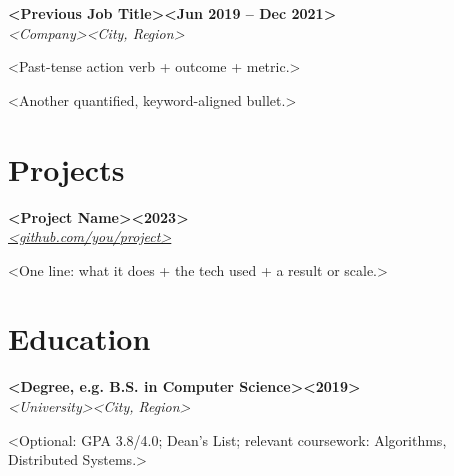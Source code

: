 \documentclass[letterpaper,11pt]{article}
\newcommand{\entry}[4]{%
  \noindent\textbf{#1}\hfill\textbf{#2}\\[1pt]%
  \textit{#3}\hfill\textit{#4}\par\vspace{2pt}%
}
\begin{document}
\entry{<Previous Job Title>}{<Jun 2019 -- Dec 2021>}{<Company>}{<City, Region>}
\begin{bullets}
  \item <Past-tense action verb + outcome + metric.>
  \item <Another quantified, keyword-aligned bullet.>
\end{bullets}

\section{Projects}

\entry{<Project Name>}{<2023>}{\href{https://<PROJECT URL>}{<github.com/you/project>}}{}
\begin{bullets}
  \item <One line: what it does + the tech used + a result or scale.>
\end{bullets}

\section{Education}

\entry{<Degree, e.g. B.S. in Computer Science>}{<2019>}{<University>}{<City, Region>}
\vspace{1pt}
<Optional: GPA 3.8/4.0; Dean's List; relevant coursework: Algorithms, Distributed Systems.>
\end{document}
